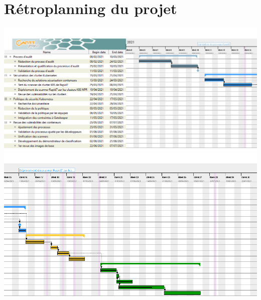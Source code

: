 \section{Rétroplanning du projet}
\label{appendix:retroplan}
\vspace{2em}
\centering
\includegraphics[width=\textwidth]{resources/img/retroplanning_pt1.png}
\includegraphics[width=\textwidth]{resources/img/retroplanning_pt2.png}